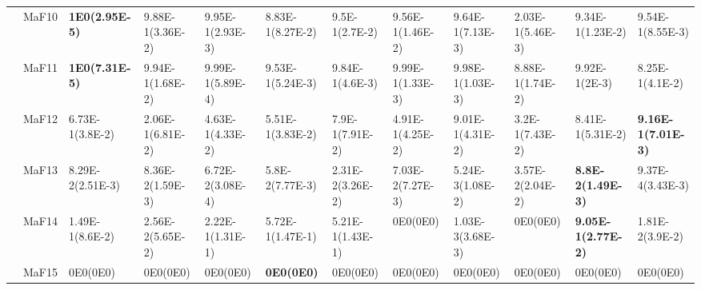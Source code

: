 \documentclass[]{article}
\begin{document}
\begin{landscape}
\begin{table}
\begin{footnotesize}
\begin{tabular}{|l|l|l|l|l|l|l|l|l|l|l|l|}
 & MaF10 & \cellcolor{gray95} {\bf 1E0(2.95E-5)} & \cellcolor{gray95} 9.88E-1(3.36E-2) & \cellcolor{gray95} 9.95E-1(2.93E-3) & 8.83E-1(8.27E-2) & 9.5E-1(2.7E-2) & 9.56E-1(1.46E-2) & 9.64E-1(7.13E-3) & 2.03E-1(5.46E-3) & 9.34E-1(1.23E-2) & 9.54E-1(8.55E-3)\\
 & MaF11 & \cellcolor{gray95} {\bf 1E0(7.31E-5)} & 9.94E-1(1.68E-2) & \cellcolor{gray95} 9.99E-1(5.89E-4) & 9.53E-1(5.24E-3) & 9.84E-1(4.6E-3) & \cellcolor{gray95} 9.99E-1(1.33E-3) & 9.98E-1(1.03E-3) & 8.88E-1(1.74E-2) & 9.92E-1(2E-3) & 8.25E-1(4.1E-2)\\
 & MaF12 & 6.73E-1(3.8E-2) & 2.06E-1(6.81E-2) & 4.63E-1(4.33E-2) & 5.51E-1(3.83E-2) & \cellcolor{gray95} 7.9E-1(7.91E-2) & 4.91E-1(4.25E-2) & \cellcolor{gray95} 9.01E-1(4.31E-2) & 3.2E-1(7.43E-2) & \cellcolor{gray95} 8.41E-1(5.31E-2) & \cellcolor{gray95} {\bf 9.16E-1(7.01E-3)}\\
 & MaF13 & \cellcolor{gray95} 8.29E-2(2.51E-3) & \cellcolor{gray95} 8.36E-2(1.59E-3) & 6.72E-2(3.08E-4) & 5.8E-2(7.77E-3) & 2.31E-2(3.26E-2) & 7.03E-2(7.27E-3) & 5.24E-3(1.08E-2) & 3.57E-2(2.04E-2) & \cellcolor{gray95} {\bf 8.8E-2(1.49E-3)} & 9.37E-4(3.43E-3)\\
 & MaF14 & 1.49E-1(8.6E-2) & 2.56E-2(5.65E-2) & 2.22E-1(1.31E-1) & \cellcolor{gray95} 5.72E-1(1.47E-1) & \cellcolor{gray95} 5.21E-1(1.43E-1) & 0E0(0E0) & 1.03E-3(3.68E-3) & 0E0(0E0) & \cellcolor{gray95} {\bf 9.05E-1(2.77E-2)} & 1.81E-2(3.9E-2)\\
 & MaF15 & \cellcolor{gray95} 0E0(0E0) & \cellcolor{gray95} 0E0(0E0) & \cellcolor{gray95} 0E0(0E0) & \cellcolor{gray95} {\bf 0E0(0E0)} & \cellcolor{gray95} 0E0(0E0) & \cellcolor{gray95} 0E0(0E0) & \cellcolor{gray95} 0E0(0E0) & \cellcolor{gray95} 0E0(0E0) & \cellcolor{gray95} 0E0(0E0) & \cellcolor{gray95} 0E0(0E0)\\
\hline
\end{tabular}
\end{footnotesize}
\end{table}
\end{landscape}
\end{document}
